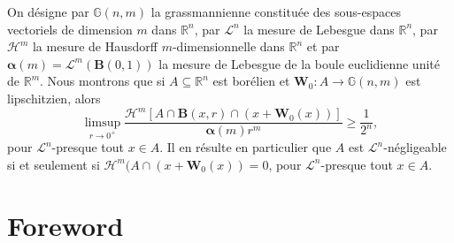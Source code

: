 \documentclass[JEP,XML,SOM,Unicode,ThmDefs,NoEqCountersInSection]{cedram}
\let\subset\subseteq
\begin{document}
\begin{altabstract}
On désigne par $\mathbb{G}(n,m)$ la grassmannienne constituée des sous-espaces vectoriels de dimension $m$ dans $\mathbb{R}^n$, par $\mathscr{L}^n$ la mesure de Lebesgue dans $\mathbb{R}^n$, par $\mathscr{H}^m$ la mesure de Hausdorff $m$-dimensionnelle dans $\mathbb{R}^n$ et par $\boldsymbol{\alpha}(m) = \mathscr{L}^m(\boldsymbol{B}(0,1))$ la mesure de Lebesgue de la boule euclidienne unité de $\mathbb{R}^m$.
Nous montrons que si $A \subset \mathbb{R}^n$ est borélien et $\boldsymbol{W}_0: A \to \mathbb{G}(n,m)$ est lipschitzien, alors
\begin{equation*}
\limsup_{r \to 0^+} \frac{\mathscr{H}^m \left[ A \cap \boldsymbol{B}(x,r) \cap (x+\boldsymbol{W}_0(x))\right]}{\boldsymbol{\alpha}(m)r^m} \geq \frac{1}{2^n},
\end{equation*}
pour $\mathscr{L}^n$-presque tout $x \in A$. Il en résulte en particulier que $A$ est $\mathscr{L}^n$-négligeable si et seule\-ment si $\mathscr{H}^m(A \cap (x+\boldsymbol{W}_0(x))=0$, pour $\mathscr{L}^n$-presque tout $x \in A$.
\end{altabstract}

\maketitle
\vspace*{-\baselineskip}
\tableofcontents
\mainmatter

\section{Foreword}
\end{document}
